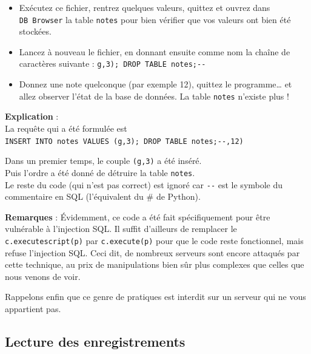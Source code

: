 \documentclass[
  letterpaper,
  DIV=11,
  numbers=noendperiod]{scrartcl}
\providecommand{\tightlist}{%
  \setlength{\itemsep}{0pt}\setlength{\parskip}{0pt}}\usepackage{longtable,booktabs,array}
\begin{document}
\begin{itemize}
\tightlist
\item
  Exécutez ce fichier, rentrez quelques valeurs, quittez et ouvrez dans
  \texttt{DB\ Browser} la table \texttt{notes} pour bien vérifier que
  vos valeurs ont bien été stockées.
\item
  Lancez à nouveau le fichier, en donnant ensuite comme nom la chaîne de
  caractères suivante :
  \texttt{g\textquotesingle{},\textquotesingle{}3\textquotesingle{});\ DROP\ TABLE\ notes;-\/-}
\item
  Donnez une note quelconque (par exemple 12), quittez le
  programme\ldots{} et allez observer l'état de la base de données. La
  table \texttt{notes} n'existe plus !
\end{itemize}

\textbf{Explication} :\\
La requête qui a été formulée est
\texttt{INSERT\ INTO\ notes\ VALUES\ (\textquotesingle{}g\textquotesingle{},\textquotesingle{}3\textquotesingle{});\ DROP\ TABLE\ notes;-\/-\textquotesingle{},\textquotesingle{}12\textquotesingle{})}

Dans un premier temps, le couple
\texttt{(\textquotesingle{}g\textquotesingle{},\textquotesingle{}3\textquotesingle{})}
a été inséré.\\
Puis l'ordre a été donné de détruire la table \texttt{notes}.\\
Le reste du code (qui n'est pas correct) est ignoré car \texttt{-\/-}
est le symbole du commentaire en SQL (l'équivalent du \# de Python).

\textbf{Remarques} : Évidemment, ce code a été fait spécifiquement pour
être vulnérable à l'injection SQL. Il suffit d'ailleurs de remplacer le
\texttt{c.executescript(p)} par \texttt{c.execute(p)} pour que le code
reste fonctionnel, mais refuse l'injection SQL. Ceci dit, de nombreux
serveurs sont encore attaqués par cette technique, au prix de
manipulations bien sûr plus complexes que celles que nous venons de
voir.

Rappelons enfin que ce genre de pratiques est interdit sur un serveur
qui ne vous appartient pas.

\hypertarget{lecture-des-enregistrements}{%
\subsection{Lecture des
enregistrements}\label{lecture-des-enregistrements}}
\end{document}
